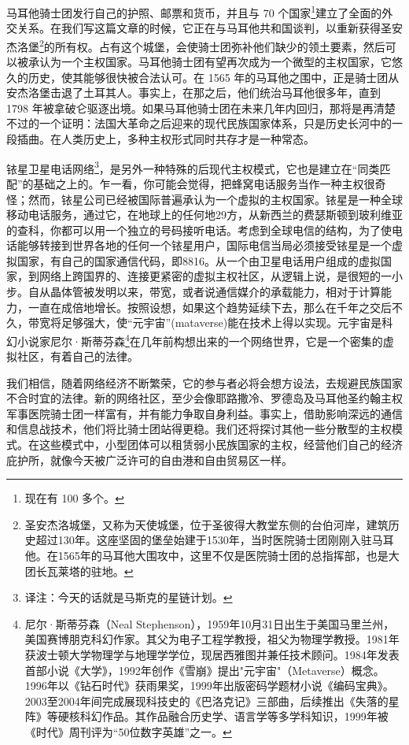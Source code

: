 马耳他骑士团发行自己的护照、邮票和货币，并且与 70 个国家\footnote{现在有 100 多个。}建立了全面的外交关系。在我们写这篇文章的时候，它正在与马耳他共和国谈判，以重新获得圣安杰洛堡\footnote{圣安杰洛城堡，又称为天使城堡，位于圣彼得大教堂东侧的台伯河岸，建筑历史超过130年。这座坚固的堡垒始建于1530年，当时医院骑士团刚刚入驻马耳他。在1565年的马耳他大围攻中，这里不仅是医院骑士团的总指挥部，也是大团长瓦莱塔的驻地。}的所有权。占有这个城堡，会使骑士团弥补他们缺少的领土要素，然后可以被承认为一个主权国家。马耳他骑士团有望再次成为一个微型的主权国家，它悠久的历史，使其能够很快被合法认可。在 1565 年的马耳他之围中，正是骑士团从安杰洛堡击退了土耳其人。事实上，在那之后，他们统治马耳他很多年，直到 1798 年被拿破仑驱逐出境。如果马耳他骑士团在未来几年内回归，那将是再清楚不过的一个证明：法国大革命之后迎来的现代民族国家体系，只是历史长河中的一段插曲。在人类历史上，多种主权形式同时共存才是一种常态。


铱星卫星电话网络\footnote{译注：今天的话就是马斯克的星链计划。}，是另外一种特殊的后现代主权模式，它也是建立在“同类匹配”的基础之上的。乍一看，你可能会觉得，把蜂窝电话服务当作一种主权很奇怪；然而，铱星公司已经被国际普遍承认为一个虚拟的主权国家。铱星是一种全球移动电话服务，通过它，在地球上的任何地29方，从新西兰的费瑟斯顿到玻利维亚的查科，你都可以用一个独立的号码接听电话。考虑到全球电信的结构，为了使电话能够转接到世界各地的任何一个铱星用户，国际电信当局必须接受铱星是一个虚拟国家，有自己的国家通信代码，即8816。从一个由卫星电话用户组成的虚拟国家，到网络上跨国界的、连接更紧密的虚拟主权社区，从逻辑上说，是很短的一小步。自从晶体管被发明以来，带宽，或者说通信媒介的承载能力，相对于计算能力，一直在成倍地增长。按照设想，如果这个趋势延续下去，那么在千年之交后不久，带宽将足够强大，使“元宇宙”(mataverse)能在技术上得以实现。元宇宙是科幻小说家尼尔·斯蒂芬森\footnote{尼尔·斯蒂芬森（Neal Stephenson），1959年10月31日出生于美国马里兰州，美国赛博朋克科幻作家。其父为电子工程学教授，祖父为物理学教授。1981年获波士顿大学物理学与地理学学位，现居西雅图并兼任技术顾问。1984年发表首部小说《大学》，1992年创作《雪崩》提出"元宇宙"（Metaverse）概念。1996年以《钻石时代》获雨果奖，1999年出版密码学题材小说《编码宝典》。2003至2004年间完成展现科技史的《巴洛克记》三部曲，后续推出《失落的星阵》等硬核科幻作品。其作品融合历史学、语言学等多学科知识，1999年被《时代》周刊评为“50位数字英雄”之一。}在几年前构想出来的一个网络世界，它是一个密集的虚拟社区，有着自己的法律。


我们相信，随着网络经济不断繁荣，它的参与者必将会想方设法，去规避民族国家不合时宜的法律。新的网络社区，至少会像耶路撒冷、罗德岛及马耳他圣约翰主权军事医院骑士团一样富有，并有能力争取自身利益。事实上，借助影响深远的通信和信息战技术，他们将比骑士团站得更稳。我们还将探讨其他一些分散型的主权模式。在这些模式中，小型团体可以租赁弱小民族国家的主权，经营他们自己的经济庇护所，就像今天被广泛许可的自由港和自由贸易区一样。


